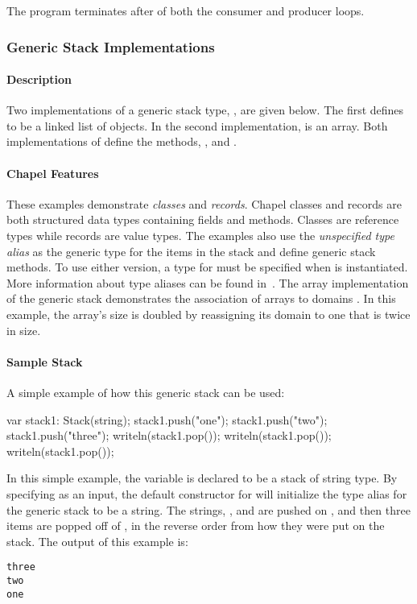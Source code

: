 The program terminates after  of both the consumer and
producer loops.

\subsubsection{Generic Stack Implementations}
\paragraph{Description}
Two implementations of a generic stack type, , are given below.  The first
defines  to be a linked list of  objects.  In
the second implementation,  is an array.  Both implementations of
 define the methods, , 
 and . 

\paragraph{Chapel Features}
These examples demonstrate {\em classes}  and {\em records}.  
Chapel classes and records
are both structured data types containing fields and methods.
Classes are reference types while records are value types.
The examples also
use the {\em unspecified type alias}   
as the generic type for the items
in the stack and define generic stack methods.  To use either version,
a type for  must be specified when  is instantiated.
More information about type aliases can be found 
in~.  The array implementation of
the generic stack demonstrates
the association of arrays to domains .  In this example, the array's size is
doubled by reassigning its domain to one that is twice in size.

\paragraph{Sample Stack}
A simple example of how this generic stack can be used:
\begin{chapel}
var stack1: Stack(string);
stack1.push("one");
stack1.push("two");
stack1.push("three");
writeln(stack1.pop());
writeln(stack1.pop());
writeln(stack1.pop());
\end{chapel}
In this simple example, the variable  is declared to be a
stack of string type.
By specifying  as an input, the default constructor for 
will initialize the type alias for the generic stack to be a string.
The strings, ,  and 
are pushed on , and then three items are popped off of ,
in the reverse order from how they were put on the stack.
The output of this example is:
{\small
\begin{verbatim}
three
two
one
\end{verbatim}}

